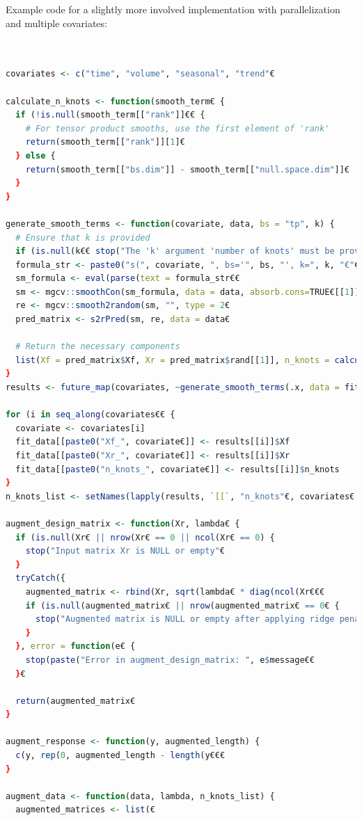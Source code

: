 \documentclass[12pt, twoside,hidelinks]{article}
\theoremstyle{definition}
\numberwithin{equation}{section}
\begin{document}
Example code for a slightly more involved implementation with parallelization and multiple covariates: 

\begin{lstlisting}[language=R]

    
covariates <- c("time", "volume", "seasonal", "trend"€

calculate_n_knots <- function(smooth_term€ {
  if (!is.null(smooth_term[["rank"]]€€ {
    # For tensor product smooths, use the first element of 'rank'
    return(smooth_term[["rank"]][1]€
  } else {
    return(smooth_term[["bs.dim"]] - smooth_term[["null.space.dim"]]€
  }
}

generate_smooth_terms <- function(covariate, data, bs = "tp", k) {
  # Ensure that k is provided
  if (is.null(k€€ stop("The 'k' argument 'number of knots' must be provided."€
  formula_str <- paste0("s(", covariate, ", bs='", bs, "', k=", k, "€"€
  sm_formula <- eval(parse(text = formula_str€€
  sm <- mgcv::smoothCon(sm_formula, data = data, absorb.cons=TRUE€[[1]]
  re <- mgcv::smooth2random(sm, "", type = 2€
  pred_matrix <- s2rPred(sm, re, data = data€
  
  # Return the necessary components
  list(Xf = pred_matrix$Xf, Xr = pred_matrix$rand[[1]], n_knots = calculate_n_knots(sm€€
}
results <- future_map(covariates, ~generate_smooth_terms(.x, data = fit_data, bs = "cs", k = 5€€

for (i in seq_along(covariates€€ {
  covariate <- covariates[i]
  fit_data[[paste0("Xf_", covariate€]] <- results[[i]]$Xf
  fit_data[[paste0("Xr_", covariate€]] <- results[[i]]$Xr
  fit_data[[paste0("n_knots_", covariate€]] <- results[[i]]$n_knots
}
n_knots_list <- setNames(lapply(results, `[[`, "n_knots"€, covariates€

augment_design_matrix <- function(Xr, lambda€ {
  if (is.null(Xr€ || nrow(Xr€ == 0 || ncol(Xr€ == 0) {
    stop("Input matrix Xr is NULL or empty"€
  }
  tryCatch({
    augmented_matrix <- rbind(Xr, sqrt(lambda€ * diag(ncol(Xr€€€
    if (is.null(augmented_matrix€ || nrow(augmented_matrix€ == 0€ {
      stop("Augmented matrix is NULL or empty after applying ridge penalty"€
    }
  }, error = function(e€ {
    stop(paste("Error in augment_design_matrix: ", e$message€€
  }€
  
  return(augmented_matrix€
}

augment_response <- function(y, augmented_length) {
  c(y, rep(0, augmented_length - length(y€€€
}

augment_data <- function(data, lambda, n_knots_list) {
  augmented_matrices <- list(€
  

\end{lstlisting}
\end{document}
